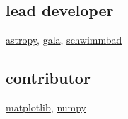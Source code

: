 \documentclass[letterpaper,12pt]{deedy-resume} %
\begin{document}
\begin{minipage}[t]{0.32\textwidth}
\subsection{lead developer}
\href{https://github.com/adrn/astropy}{astropy},
\href{https://github.com/adrn/gala}{gala},
\href{https://github.com/adrn/schwimmbad}{schwimmbad}

\sectionspace %

\subsection{contributor}
\href{https://github.com/matplotlib/matplotlib}{matplotlib},
\href{https://github.com/numpy/numpy}{numpy}

\sectionspace %







\end{minipage} %
\hfill
%
%
\end{document}
